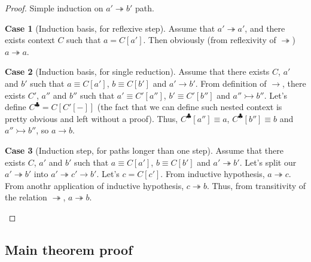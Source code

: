 \documentclass[a4paper,11pt]{article}
\theoremstyle{definition}
\newtheorem{case}{Case}
\begin{document}
\begin{proof}
 Simple induction on $a' \twoheadrightarrow b'$ path.
 \begin{case}[Induction basis, for reflexive step]
  Assume that $a' \twoheadrightarrow a'$, and there exists context $C$ such that $a = C[a']$.
  Then obviously (from reflexivity of $\twoheadrightarrow$) $a \twoheadrightarrow a$.
 \end{case}
 
 \begin{case}[Induction basis, for single reduction]
   Assume that there exists $C$, $a'$ and $b'$ such that $a \equiv C[a']$, $b \equiv C[b']$ and $a' \rightarrow b'$.
   From definition of $\rightarrow$, there exists $C'$, $a''$ and $b''$ such
   that $a' \equiv C'[a'']$, $b' \equiv C'[b'']$ and $a'' \rightarrowtail b''$.
   Let's define $C^\clubsuit = C[C'[-]]$ (the fact that we can define such nested context is pretty obvious and left without a proof).
   Thus, $C^\clubsuit[a''] \equiv a$, $C^\clubsuit[b''] \equiv b$ and $a'' \rightarrowtail b''$, so $a \rightarrow b$.
 \end{case}

 \begin{case}[Induction step, for paths longer than one step]
   Assume that there exists $C$, $a'$ and $b'$ such that $a \equiv C[a']$, $b \equiv C[b']$ and $a' \twoheadrightarrow b'$.
   Let's split our $a' \twoheadrightarrow b'$ into $a' \twoheadrightarrow c' \rightarrow b'$.
   Let's $c = C[c']$. From inductive hypothesis, $a \twoheadrightarrow c$.
   From anothr application of inductive hypothesis, $c \twoheadrightarrow b$.
   Thus, from transitivity of the relation $\twoheadrightarrow$, $a \twoheadrightarrow b$.
 \end{case}
\end{proof}

\subsection{Main theorem proof}

\setcounter{case}{0}
\end{document}
